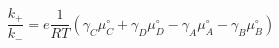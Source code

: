 \begin{equation}
\frac{k_+}{k_-}  = e\frac{1}{RT}\left(\gamma_C\mu_C^\circ+ \gamma_D\mu_D^\circ -\gamma_A\mu_A^\circ-\gamma_B\mu_B^\circ\right)
\end{equation}
